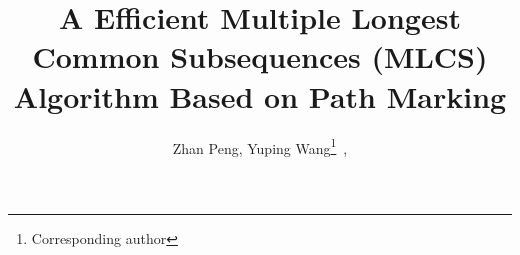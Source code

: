 %

\usepackage{enumerate}

\usepackage{graphicx}
\usepackage{algorithm}
\usepackage{algorithmic}
\usepackage{multirow}
\usepackage{amsmath}
\usepackage{color}
\newcommand{\SWITCH}[1]{\STATE \textbf{switch} (#1)}
\newcommand{\ENDPWITCH}{\STATE \textbf{end switch}}
\newcommand{\CASE}[1]{\STATE \textbf{case} #1\textbf{:} \begin{ALC@g}}
\newcommand{\ENDCASE}{\end{ALC@g}}
\newcommand{\CASELINE}[1]{\STATE \textbf{case} #1\textbf{:} }
\newcommand{\DEFAULT}{\STATE \textbf{default:} \begin{ALC@g}}
\newcommand{\ENDDEFAULT}{\end{ALC@g}}
\newcommand{\DEFAULTLINE}[1]{\STATE \textbf{default:} }
\newtheorem{mydef}{Definition}
\newtheorem{mylm}{Proposition}

\renewcommand{\algorithmicrequire}{\textbf{Input:}}
\renewcommand{\algorithmicensure}{\textbf{Output:}}





\title{A Efficient Multiple Longest Common Subsequences (MLCS)
  Algorithm Based on Path Marking}


\author{Zhan Peng, Yuping Wang\footnote{Corresponding author}~,}

\address{$^1$School of Computer Science and Technology\\
  Xidian University\\
  Xi'an, Shaanxi, 710071, China\\
   $^*$ywang@xidian.edu.cn
}

\maketitle


